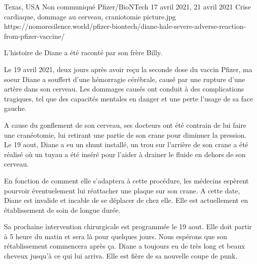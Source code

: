           {Texas, USA}
          {Non communiqué}
          {Pfizer/BioNTech}
          {17 avril 2021, 21 avril 2021}
          {Crise cardiaque, dommage au cerveau, craniotomie}
          {picture.jpg}
          {https://nomoresilence.world/pfizer-biontech/diane-hale-severe-adverse-reaction-from-pfizer-vaccine/}
          {

L'histoire de Diane a été raconté par son frère Billy.

Le 19 avril 2021, deux jours après avoir reçu la seconde dose du vaccin Pfizer,
ma soeur Diane a souffert d'une hémorragie cérébrale, causé par une rupture
d'une artère dans son cerveau. Les dommages causés ont conduit à des
complications tragiques, tel que des capacités mentales en danger et une perte
l'usage de sa face gauche.

A cause du gonflement de son cerveau, ses docteurs ont été contrain de lui faire
une cranéotomie, lui retirant une partie de son crane pour diminuer la
pression. Le 19 aout, Diane a eu un shunt installé, un trou sur l'arrière de son
crane a été réalisé où un tuyau a été inséré pour l'aider à drainer le fluide en
dehors de son cerveau.

En fonction de comment elle s'adaptera à cette procédure, les médecins espèrent
pourvoir éventuelement lui réattacher une plaque sur son crane. A cette date,
Diane est invalide et incable de se déplacer de chez elle. Elle est actuellement
en établissement de soin de longue durée.

Sa prochaine intervention chirurgicale est programmée le 19 aout. Elle doit
partir à 5 heure du matin et sera là pour quelques jours. Nous espérons que son
rétablissement commencera après ça. Diane a toujours eu de très long et beaux
cheveux jusqu'à ce qui lui arriva. Elle est fière de sa nouvelle coupe de punk.

}
